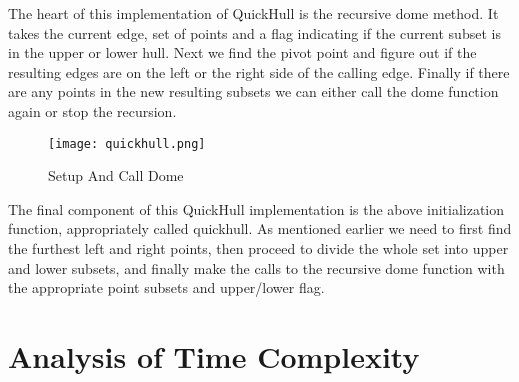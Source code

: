\documentclass[a4paper, 12pt]{article}
\begin{document}
{The heart of this implementation of QuickHull is the recursive dome method. It takes the current edge, set of points and a flag indicating if the current subset is in the upper or lower hull. Next we find the pivot point and figure out if the resulting edges are on the left or the right side of the calling edge. Finally if there are any points in the new resulting subsets we can either call the dome function again or stop the recursion. 

  \begin{figure}[H]
  \begin{center}
    \texttt{[image: quickhull.png]}
  \end{center}
    \caption{Setup And Call Dome}
    \label{fig:quickhull}
  \end{figure}

  The final component of this QuickHull implementation is the above initialization function, appropriately called quickhull.  As mentioned earlier we need to first find the furthest left and right points, then proceed to divide the whole set into upper and lower subsets, and finally make the calls to the recursive dome function with the appropriate point subsets and upper/lower flag. 

  \section{Analysis of Time Complexity}
}
\end{document}
